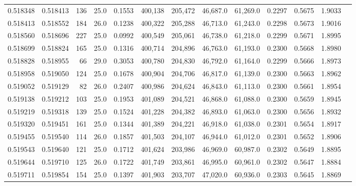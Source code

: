 \begin{tabular}{rrrrrrrrrrrrr}
0.518348 & 0.518413 &   136 & 25.0 &                                     0.1553 & 400,138 & 205,472 &  46,687.0 &  61,269.0 & 0.2297 & 0.5675 & 1.9033 \\
0.518413 & 0.518552 &   184 & 26.0 &                                     0.1238 & 400,322 & 205,288 &  46,713.0 &  61,243.0 & 0.2298 & 0.5673 & 1.9016 \\
0.518560 & 0.518696 &   227 & 25.0 &                                     0.0992 & 400,549 & 205,061 &  46,738.0 &  61,218.0 & 0.2299 & 0.5671 & 1.8995 \\
0.518699 & 0.518824 &   165 & 25.0 &                                     0.1316 & 400,714 & 204,896 &  46,763.0 &  61,193.0 & 0.2300 & 0.5668 & 1.8980 \\
0.518828 & 0.518955 &    66 & 29.0 &                                     0.3053 & 400,780 & 204,830 &  46,792.0 &  61,164.0 & 0.2299 & 0.5666 & 1.8973 \\
0.518958 & 0.519050 &   124 & 25.0 &                                     0.1678 & 400,904 & 204,706 &  46,817.0 &  61,139.0 & 0.2300 & 0.5663 & 1.8962 \\
0.519052 & 0.519129 &    82 & 26.0 &                                     0.2407 & 400,986 & 204,624 &  46,843.0 &  61,113.0 & 0.2300 & 0.5661 & 1.8954 \\
0.519138 & 0.519212 &   103 & 25.0 &                                     0.1953 & 401,089 & 204,521 &  46,868.0 &  61,088.0 & 0.2300 & 0.5659 & 1.8945 \\
0.519219 & 0.519318 &   139 & 25.0 &                                     0.1524 & 401,228 & 204,382 &  46,893.0 &  61,063.0 & 0.2300 & 0.5656 & 1.8932 \\
0.519320 & 0.519451 &   161 & 25.0 &                                     0.1344 & 401,389 & 204,221 &  46,918.0 &  61,038.0 & 0.2301 & 0.5654 & 1.8917 \\
0.519455 & 0.519540 &   114 & 26.0 &                                     0.1857 & 401,503 & 204,107 &  46,944.0 &  61,012.0 & 0.2301 & 0.5652 & 1.8906 \\
0.519543 & 0.519640 &   121 & 25.0 &                                     0.1712 & 401,624 & 203,986 &  46,969.0 &  60,987.0 & 0.2302 & 0.5649 & 1.8895 \\
0.519644 & 0.519710 &   125 & 26.0 &                                     0.1722 & 401,749 & 203,861 &  46,995.0 &  60,961.0 & 0.2302 & 0.5647 & 1.8884 \\
0.519711 & 0.519854 &   154 & 25.0 &                                     0.1397 & 401,903 & 203,707 &  47,020.0 &  60,936.0 & 0.2303 & 0.5645 & 1.8869 \\

\end{tabular}
